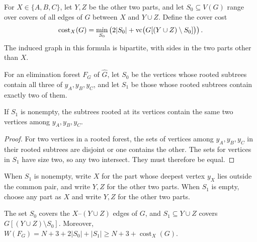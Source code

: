 For $X\in\{A,B,C\}$, let $Y,Z$ be the other two parts, and let
$S_0\subseteq V(G)$ range over covers of all edges of $G$ between
$X$ and $Y\cup Z$. Define the cover cost
\begin{equation}\label{eq:np-total-depth-cover-cost}
 \operatorname{cost}_X(G)=\min_{S_0}
 \left(2|S_0|+
       \operatorname{vc}\bigl(G[(Y\cup Z)\setminus S_0]\bigr)\right).
\end{equation}
The induced graph in this formula is bipartite, with sides in the two
parts other than $X$.

For an elimination forest $F_G$ of $\widehat G$, let $S_0$ be the
vertices whose rooted subtrees contain all three of $y_A,y_B,y_C$,
and let $S_1$ be those whose rooted subtrees contain exactly two of them.

\begin{lemma}\label{lem:clique-path-pair}
If $S_1$ is nonempty, the subtrees rooted at its vertices contain the
same two vertices among $y_A,y_B,y_C$.
\end{lemma}

\begin{proof}
For two vertices in a rooted forest, the sets of vertices among
$y_A,y_B,y_C$ in their rooted subtrees are disjoint or one contains the other.
The sets for vertices in $S_1$ have size two, so any two intersect.
They must therefore be equal.
\end{proof}

When $S_1$ is nonempty, write $X$ for the part whose deepest vertex
$y_X$ lies outside the common pair, and write $Y,Z$ for the other two
parts.
When $S_1$ is empty, choose any part as $X$ and write $Y,Z$ for the
other two parts.

\begin{lemma}\label{lem:clique-path-covers}
The set $S_0$ covers the $X$--$(Y\cup Z)$ edges of $G$, and
$S_1\subseteq Y\cup Z$ covers $G[(Y\cup Z)\setminus S_0]$.
Moreover, $W(F_G)=N+3+2|S_0|+|S_1|\ge
N+3+\operatorname{cost}_X(G)$.
\end{lemma}


